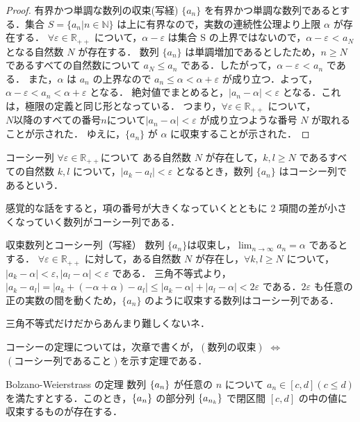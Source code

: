 \documentclass[a4paper]{ltjsarticle}
\begin{document}
  \begin{proof}{有界かつ単調な数列の収束(写経)}{}
   $\{a_n\}$ を有界かつ単調な数列であるとする．集合 $S = \{a_n | n \in \mathbb{N}\}$ は上に有界なので，実数の連続性公理より上限 $\alpha$ が存在する．
   $\forall \varepsilon \in \mathbb{R_{++}}$ について，$\alpha - \varepsilon$ は集合 S の上界ではないので，$\alpha - \varepsilon$ < $a_N$ となる自然数 $N$ が存在する．
   数列 $\{a_n\}$ は単調増加であるとしたため，$n \geq N$ であるすべての自然数について $a_N \leq a_n$ である．したがって，$\alpha - \varepsilon$ < $a_n$ である．
   また，$\alpha$ は $a_n$ の上界なので $a_n \leq \alpha < \alpha + \varepsilon$ が成り立つ．よって，$\alpha - \varepsilon < a_n < \alpha + \varepsilon$ となる．
   絶対値でまとめると，$|a_n - \alpha| < \varepsilon$ となる．これは，極限の定義と同じ形となっている．
   つまり，$\forall \varepsilon \in \mathbb{R_{++}}$ について，$N 以降のすべての番号 n について |a_n - \alpha| < \varepsilon$ が成り立つような番号 $N$ が取れることが示された．
   ゆえに，$\{a_n\}$ が $\alpha$ に収束することが示された．
  \end{proof}

  \begin{tcb}{コーシー列}{}
   $\forall \varepsilon \in \mathbb{R_{++}}$について ある自然数 $N$ が存在して，$k, l \geq N$ であるすべての自然数 $k, l$
   について，$|a_k - a_l| < \varepsilon$ となるとき，数列 $\{a_n\}$ はコーシー列であるという．
  \end{tcb}
 感覚的な話をすると，項の番号が大きくなっていくとともに 2 項間の差が小さくなっていく数列がコーシー列である．

  \begin{theorem}{収束数列とコーシー列（写経）}{}
   数列 $\{a_n\} は収束し，\lim_{n \rightarrow \infty} a_n = \alpha$ であるとする．
   $\forall\varepsilon \in \mathbb{R_{++}}$ に対して，ある自然数 $N$ が存在し，$\forall k, l \geq N$ について，
   $|a_k - \alpha| < \varepsilon, |a_l - \alpha| < \varepsilon$ である．
   三角不等式より，$|a_k - a_l| = |a_k + (-\alpha + \alpha) - a_l| \leq |a_k - \alpha| + |a_l - \alpha| < 2 \varepsilon$
   である．$2\varepsilon$ も任意の正の実数の間を動くため，$\{a_n\}$ のように収束する数列はコーシー列である．
  \end{theorem}
 三角不等式だけだからあんまり難しくないネ．

 コーシーの定理については，次章で書くが，$(数列の収束)$ $\Leftrightarrow$ $(コーシー列であること)$を示す定理である．

  \begin{theorem}{Bolzano-Weierstrass の定理}{}
   数列 $\{a_n\}$ が任意の $n$ について $a_n \in [c, d] (c \leq d)$を満たすとする．このとき，$\{a_n\}$ の部分列 $\{a_{n_k}\}$ で閉区間 $[c, d]$ の中の値に収束するものが存在する．
  \end{theorem}
\end{document}
